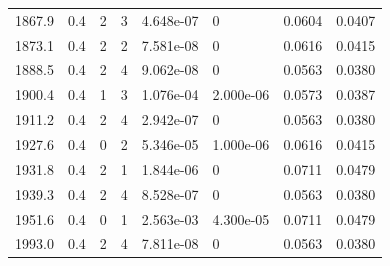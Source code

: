 \documentclass[preview]{standalone}
\begin{document}
{{{{{\begin{tabular}{L{1.2cm}C{1.2cm} C{0.3cm}C{0.5cm} C{1.4cm}C{1.4cm} C{1.4cm}C{1.4cm}}
  1867.9  &   0.4  & 2     &  3 &  4.648e-07  & 0  & 0.0604 &  0.0407   \\ 
  1873.1  &   0.4  & 2     &  2 &  7.581e-08  & 0  & 0.0616 &  0.0415   \\ 
  1888.5  &   0.4  & 2     &  4 &  9.062e-08  & 0  & 0.0563 &  0.0380   \\ 
  1900.4  &   0.4  & 1     &  3 &  1.076e-04  & 2.000e-06  & 0.0573 &  0.0387   \\ 
  1911.2  &   0.4  & 2     &  4 &  2.942e-07  & 0  & 0.0563 &  0.0380   \\ 
  1927.6  &   0.4  & 0     &  2 &  5.346e-05  & 1.000e-06  & 0.0616 &  0.0415   \\ 
  1931.8  &   0.4  & 2     &  1 &  1.844e-06  & 0  & 0.0711 &  0.0479   \\ 
  1939.3  &   0.4  & 2     &  4 &  8.528e-07  & 0  & 0.0563 &  0.0380   \\ 
  1951.6  &   0.4  & 0     &  1 &  2.563e-03  & 4.300e-05  & 0.0711 &  0.0479   \\ 
  1993.0  &   0.4  & 2     &  4 &  7.811e-08  & 0  & 0.0563 &  0.0380   \\ 
\hline 
\end{tabular} 

}}}}}
\end{document}
